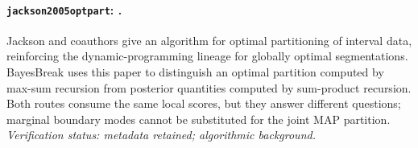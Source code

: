 
\paragraph{\texttt{jackson2005optpart}: \citet{jackson2005optpart}.}
Jackson and coauthors give an algorithm for optimal partitioning of interval data, reinforcing the dynamic-programming lineage for globally optimal segmentations. BayesBreak uses this paper to distinguish an optimal partition computed by max-sum recursion from posterior quantities computed by sum-product recursion. Both routes consume the same local scores, but they answer different questions; marginal boundary modes cannot be substituted for the joint MAP partition. \textit{Verification status: metadata retained; algorithmic background.}
